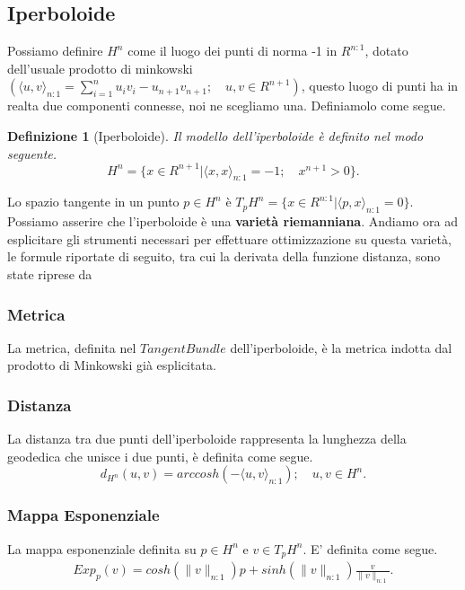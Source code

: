 \documentclass[a4paper, 12pt]{article}
\newtheorem{definition}{Definizione}
\begin{document}
\subsection{Iperboloide}
Possiamo definire $H^n$ come il luogo dei punti di norma -1 in $R^{n:1}$, dotato dell'usuale prodotto di minkowski $(\langle u, v \rangle_{n:1} = \sum_{i=1}^{n} u_iv_i - u_{n+1}v_{n+1}; \quad u,v \in R^{n+1})$, questo luogo di punti ha in realta due componenti connesse, noi ne scegliamo una. Definiamolo come segue.
\begin{definition}[Iperboloide]
Il modello dell'iperboloide è definito nel modo seguente.\\
\[H^n = \{x \in R^{n+1} | \langle x, x \rangle_{n:1} = -1; \quad x^{n+1} > 0 \}.\]
\end{definition}
Lo spazio tangente in un punto $p \in H^n$ è $T_pH^n = \{x \in R^{n:1} | \langle p,x \rangle_{n:1} = 0\}$.\\
Possiamo asserire che l'iperboloide è una \textbf{varietà riemanniana}. Andiamo ora ad esplicitare gli strumenti necessari per effettuare ottimizzazione su questa varietà, le formule riportate di seguito, tra cui la derivata della funzione distanza, sono state riprese da \cite{Gradient Descent in Hyperbolic Space}
\subsubsection{Metrica}
La metrica, definita nel $Tangent Bundle$ dell'iperboloide, è la metrica indotta dal prodotto di Minkowski già esplicitata.
\subsubsection{Distanza}
La distanza tra due punti dell'iperboloide rappresenta la lunghezza della geodedica che unisce i due punti, è definita come segue.\\
\[d_{H^n} (u,v) = arccosh(-\langle u, v \rangle_{n:1}); \quad u,v \in H^n.\]
\subsubsection{Mappa Esponenziale}
La mappa esponenziale definita su $p \in H^n$ e $v \in T_pH^n$. E' definita come segue.\\
\begin{equation*}\begin{gathered}
Exp_p(v) = cosh(\parallel v \parallel_{n:1})p + sinh(\parallel v \parallel_{n:1}) \frac{v}{\parallel v \parallel_{n:1}}.
\end{gathered}\end{equation*}
\end{document}
